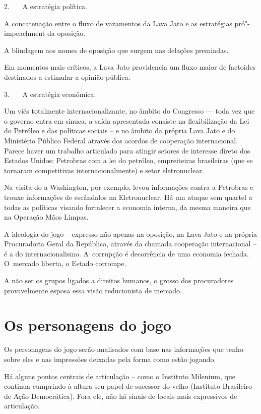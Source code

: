2.~~~ A estratégia política.

A concatenação entre o fluxo de vazamentos da Lava Jato e as estratégias
pró"-impeachment da oposição.

A blindagem aos nomes de oposição que surgem nas delações premiadas.

Em momentos mais críticos, a Lava Jato providencia um fluxo maior de
factoides destinados a estimular a opinião pública.

3.~~~ A estratégia econômica.

Um viés totalmente internacionalizante, no âmbito do Congresso --- toda
vez que o governo entra em sinuca, a saída apresentada consiste na
flexibilização da Lei do Petróleo e das políticas sociais -- e no âmbito
da própria Lava Jato e do Ministério Público Federal através dos acordos
de cooperação internacional. Parece haver um trabalho articulado para
atingir setores de interesse direto dos Estados Unidos: Petrobras com a
lei do petróleo, empreiteiras brasileiras (que se tornaram competitivas
internacionalmente) e setor eletronuclear.

Na visita do  a Washington, por exemplo, levou informações contra a
Petrobras e trouxe informações de escândalos na Eletronuclear. Há um
ataque sem quartel a todas as políticas visando fortalecer a economia
interna, da mesma maneira que na Operação Mãos Limpas.

A ideologia do jogo -- expresso não apenas na oposição, na Lava Jato e
na própria Procuradoria Geral da República, através da chamada
cooperação internacional -- é a do internacionalismo. A~corrupção é
decorrência de uma economia fechada. O~mercado liberta, o Estado
corrompe.

A não ser os grupos ligados a direitos humanos, o grosso dos
procuradores provavelmente esposa essa visão reducionista de mercado.

\section{Os personagens do jogo}

Os personagens do jogo serão analisados com base nas informações que
tenho sobre eles e nas impressões deixadas pela forma como estão
jogando.

Há alguns pontos centrais de articulação -- como o Instituto Milenium,
que continua cumprindo à altura seu papel de sucessor do velho 
(Instituto Brasileiro de Ação Democrática). Fora ele, não há sinais de
locais mais expressivos de articulação.

